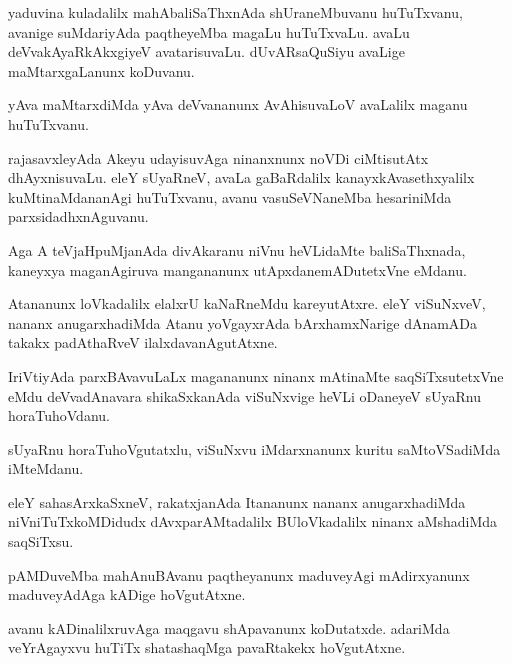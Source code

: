 \documentclass{article}
\begin{document}
\begin{mn}%
yaduvina kuladalilx mahAbaliSaThxnAda shUraneMbuvanu huTuTxvanu,
avanige suMdariyAda paqtheyeMba magaLu huTuTxvaLu. avaLu
deVvakAyaRkAkxgiyeV avatarisuvaLu. dUvARsaQuSiyu avaLige
maMtarxgaLanunx koDuvanu.
\end{mn}

\begin{mn}
yAva maMtarxdiMda yAva deVvananunx AvAhisuvaLoV avaLalilx maganu huTuTxvanu.
\end{mn}

\begin{mn}%
rajasavxleyAda Akeyu udayisuvAga ninanxnunx noVDi ciMtisutAtx
dhAyxnisuvaLu. eleY sUyaRneV, avaLa gaBaRdalilx kanayxkAvasethxyalilx
kuMtinaMdananAgi huTuTxvanu, avanu vasuSeVNaneMba hesariniMda parxsidadhxnAguvanu.
\end{mn}

\begin{mn}
Aga A teVjaHpuMjanAda divAkaranu niVnu heVLidaMte baliSaThxnada,
kaneyxya maganAgiruva mangananunx utApxdanemADutetxVne eMdanu.
\end{mn}

\begin{mn}
Atananunx loVkadalilx elalxrU kaNaRneMdu kareyutAtxre. eleY viSuNxveV,
nananx anugarxhadiMda Atanu yoVgayxrAda bArxhamxNarige dAnamADa takakx
padAthaRveV ilalxdavanAgutAtxne.
\end{mn}

\begin{mn}%
IriVtiyAda parxBAvavuLaLx magananunx ninanx mAtinaMte saqSiTxsutetxVne
eMdu deVvadAnavara shikaSxkanAda viSuNxvige heVLi oDaneyeV sUyaRnu horaTuhoVdanu.
\end{mn}

\begin{mn}
sUyaRnu horaTuhoVgutatxlu, viSuNxvu iMdarxnanunx kuritu saMtoVSadiMda iMteMdanu.
\end{mn}

\begin{mn}
eleY sahasArxkaSxneV, rakatxjanAda Itananunx nananx anugarxhadiMda
niVniTuTxkoMDidudx dAvxparAMtadalilx BUloVkadalilx ninanx aMshadiMda saqSiTxsu.
\end{mn}

\begin{mn}
pAMDuveMba mahAnuBAvanu paqtheyanunx maduveyAgi mAdirxyanunx
maduveyAdAga kADige hoVgutAtxne.
\end{mn}

\begin{mn}
avanu kADinalilxruvAga maqgavu shApavanunx koDutatxde. adariMda
veYrAgayxvu huTiTx shatashaqMga pavaRtakekx hoVgutAtxne.
\end{mn}
\end{document}
